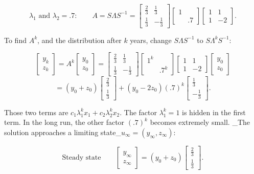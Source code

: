 \[\lambda_{1}\text{ and }\lambda_{2}=.7:\qquad A=S\Lambda S^{-1}=\begin{bmatrix} \frac{2}{3}&\frac{1}{3}\\ \frac{1}{3}&-\frac{1}{3}\end{bmatrix}\begin{bmatrix}1&\\ &.7\end{bmatrix}\begin{bmatrix}1&1\\ 1&-2\end{bmatrix}.\]

To find \(A^{k}\), and the distribution after \(k\) years, change \(S\Lambda S^{-1}\) to \(S\Lambda^{k}S^{-1}\):

\[\begin{bmatrix}y_{k}\\ z_{k}\end{bmatrix} =A^{k}\begin{bmatrix}y_{0}\\ z_{0}\end{bmatrix}=\begin{bmatrix}\frac{2}{3}&\frac{1}{3}\\ \frac{1}{3}&-\frac{1}{3}\end{bmatrix}\begin{bmatrix}1^{k}&\\ &.7^{k}\end{bmatrix}\begin{bmatrix}1&1\\ 1&-2\end{bmatrix}\begin{bmatrix}y_{0}\\ z_{0}\end{bmatrix}\] \[=(y_{0}+z_{0})\begin{bmatrix}\frac{2}{3}\\ \frac{1}{3}\end{bmatrix}+(y_{0}-2z_{0})(.7)^{k}\begin{bmatrix}\frac{1}{3}\\ -\frac{1}{3}\end{bmatrix}.\]

Those two terms are \(c_{1}\lambda_{1}^{k}x_{1}+c_{2}\lambda_{2}^{k}x_{2}\). The factor \(\lambda_{1}^{k}=1\) is hidden in the first term. In the long run, the other factor \((.7)^{k}\) becomes extremely small. _The solution approaches a limiting state_\(u_{\infty}=(y_{\infty},z_{\infty})\):

\[\text{Steady state}\qquad\begin{bmatrix}y_{\infty}\\ z_{\infty}\end{bmatrix}=(y_{0}+z_{0})\begin{bmatrix}\frac{2}{3}\\ \frac{1}{3}\end{bmatrix}.\]

